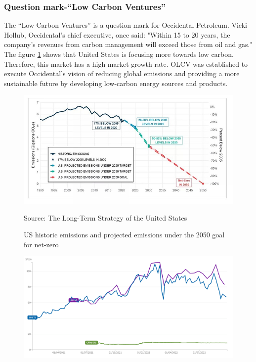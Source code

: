 \documentclass[
	a4paper, %
	12pt,%
]{CSSullivanBusinessReport}
\begin{document}
\begin{fullwidth}
\subsubsection{Question mark-“Low Carbon Ventures”}
The “Low Carbon Ventures” is a question mark for Occidental Petroleum. Vicki Hollub, Occidental's chief executive, once said: "Within 15 to 20 years, the company's revenues from carbon management will exceed those from oil and gas." The figure \ref{Historic_emmission} shows that United States is focusing more towards low carbon. Therefore, this market has a high market growth rate. OLCV was established to execute Occidental's vision of reducing global emissions and providing a more sustainable future by developing low-carbon energy sources and products. 
\begin{figure}[h]
    \centering
    \includegraphics{Images/US historic emissions and projected emissions under the 2050 goal for net-zero.jpg}
    \caption{US historic emissions and projected emissions under the 2050 goal for net-zero}
    Source: The Long-Term Strategy of the United States
    \label{Historic_emmission}
\end{figure}
\begin{figure}[H]
    \centering
    \includegraphics{Images/carbon market price trend.png}

\end{figure}
\end{fullwidth}
\end{document}
